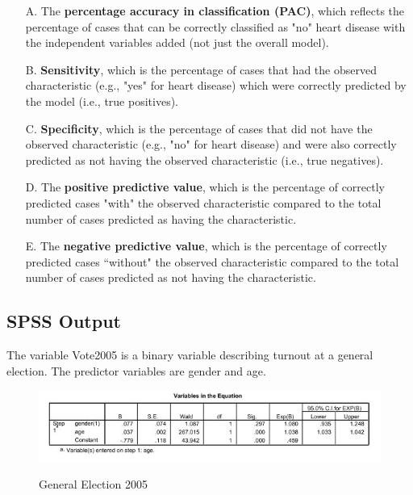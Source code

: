 \documentclass[a4paper,12pt]{article}
\begin{document}
\begin{itemize}
	\item[A.] The \textbf{percentage accuracy in classification (PAC)}, which reflects the percentage of cases that can be correctly classified as "no" heart disease with the independent variables added (not just the overall model).
	\item[B.] \textbf{Sensitivity}, which is the percentage of cases that had the observed characteristic (e.g., "yes" for heart disease) which were correctly predicted by the model (i.e., true positives).
	\item[C.] \textbf{Specificity}, which is the percentage of cases that did not have the observed characteristic (e.g., "no" for heart disease) and were also correctly predicted as not having the observed characteristic (i.e., true negatives).
	\item[D.] The \textbf{positive predictive value}, which is the percentage of correctly predicted cases "with" the observed characteristic compared to the total number of cases predicted as having the characteristic.
	\item[E.] The \textbf{negative predictive value}, which is the percentage of correctly predicted cases ``without" the observed characteristic compared to the total number of cases predicted as not having the characteristic.
\end{itemize}




	
\subsection{SPSS Output}
The variable Vote2005 is a binary variable describing turnout at a general election. The predictor variables are gender and age.
\begin{center}
	\begin{figure}[h!]
		\includegraphics[scale=0.6]{images/LogWeek10B.jpg}\\
		\caption{General Election 2005}
	\end{figure}
\end{center}
\end{document}
